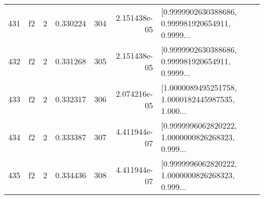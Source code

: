 \begin{tabular}{lllrlrl}
431 &  f2 &   2 &  0.330224 &  304 &  2.151438e-05 &  [0.9999902630388686, 0.999981920654911, 0.9999... \\
432 &  f2 &   2 &  0.331268 &  305 &  2.151438e-05 &  [0.9999902630388686, 0.999981920654911, 0.9999... \\
433 &  f2 &   2 &  0.332317 &  306 &  2.074216e-05 &  [1.0000089495251758, 1.0000182445987535, 1.000... \\
434 &  f2 &   2 &  0.333387 &  307 &  4.411944e-07 &  [0.9999996062820222, 1.0000000826268323, 0.999... \\
435 &  f2 &   2 &  0.334436 &  308 &  4.411944e-07 &  [0.9999996062820222, 1.0000000826268323, 0.999... \\
\bottomrule
\end{tabular}
